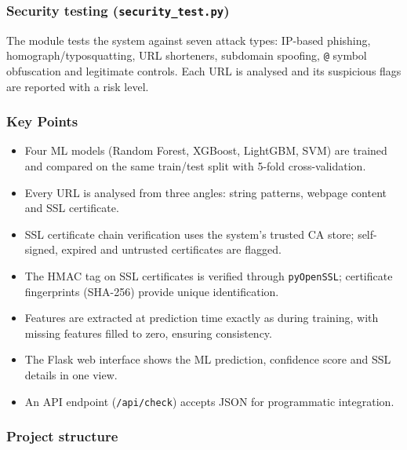 \documentclass[11pt,a4paper]{article}
\begin{document}
\subsubsection*{Security testing (\texttt{security\_test.py})}

The module tests the system against seven attack types: IP-based phishing, homograph/typosquatting, URL shorteners, subdomain spoofing, \texttt{@} symbol obfuscation and legitimate controls. Each URL is analysed and its suspicious flags are reported with a risk level.

\subsubsection{Key Points}

\begin{itemize}
  \item Four ML models (Random Forest, XGBoost, LightGBM, SVM) are trained and compared on the same train/test split with 5-fold cross-validation.
  \item Every URL is analysed from three angles: string patterns, webpage content and SSL certificate.
  \item SSL certificate chain verification uses the system's trusted CA store; self-signed, expired and untrusted certificates are flagged.
  \item The HMAC tag on SSL certificates is verified through \texttt{pyOpenSSL}; certificate fingerprints (SHA-256) provide unique identification.
  \item Features are extracted at prediction time exactly as during training, with missing features filled to zero, ensuring consistency.
  \item The Flask web interface shows the ML prediction, confidence score and SSL details in one view.
  \item An API endpoint (\texttt{/api/check}) accepts JSON for programmatic integration.
\end{itemize}

\subsubsection*{Project structure}
\end{document}
